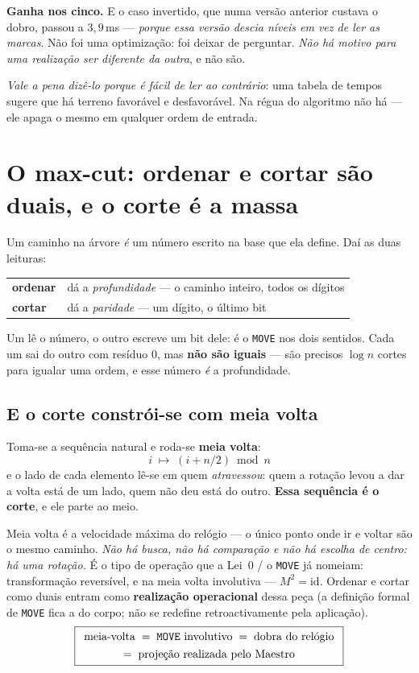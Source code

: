 \documentclass[11pt,a4paper]{article}
\newcommand{\code}[1]{\texttt{\small #1}}
\begin{document}
\smallskip
\noindent \textbf{Ganha nos cinco.} E o caso invertido, que numa versão anterior custava o dobro,
passou a $3{,}9$\,ms --- \emph{porque essa versão descia níveis em vez de ler as marcas}. Não foi
uma optimização: foi deixar de perguntar. \emph{Não há motivo para uma realização ser diferente da
outra}, e não são.

\smallskip
\noindent \emph{Vale a pena dizê-lo porque é fácil de ler ao contrário}: uma tabela de tempos
sugere que há terreno favorável e desfavorável. Na régua do algoritmo não há --- ele apaga o mesmo
em qualquer ordem de entrada.

\section{O max-cut: ordenar e cortar são duais, e o corte é a massa}\label{sec:cortar}

Um caminho na árvore \emph{é} um número escrito na base que ela define. Daí as duas leituras:

\begin{center}\small
\begin{tabular}{@{}ll@{}}
\toprule
\textbf{ordenar} & dá a \emph{profundidade} --- o caminho inteiro, todos os dígitos \\
\textbf{cortar} & dá a \emph{paridade} --- um dígito, o último bit \\
\bottomrule
\end{tabular}
\end{center}

\noindent Um lê o número, o outro escreve um bit dele: é o \code{MOVE} nos dois sentidos. Cada um sai
do outro com resíduo $0$, mas \textbf{não são iguais} --- são precisos $\log n$ cortes para igualar
uma ordem, e esse número \emph{é} a profundidade.

\subsection*{E o corte constrói-se com meia volta}

Toma-se a sequência natural e roda-se \textbf{meia volta}:
\[
  \boxed{\;i \;\longmapsto\; (i + n/2) \bmod n\;}
\]
e o lado de cada elemento lê-se em quem \emph{atravessou}: quem a rotação levou a dar a volta está de
um lado, quem não deu está do outro. \textbf{Essa sequência é o corte}, e ele parte ao meio.

\smallskip
\noindent Meia volta é a velocidade máxima do relógio --- o único ponto onde ir e voltar são o mesmo
caminho. \emph{Não há busca, não há comparação e não há escolha de centro: há uma rotação.} É o
tipo de operação que a Lei~$0$ / o \code{MOVE} já nomeiam: transformação reversível, e na meia volta
involutiva --- $M^{2}=\mathrm{id}$. Ordenar e cortar como duais entram como \textbf{realização
operacional} dessa peça (a definição formal de \code{MOVE} fica a do corpo; não se redefine
retroactivamente pela aplicação).
\[
\boxed{
\begin{array}{c}
\text{meia-volta}
\;=\;
\text{\texttt{MOVE} involutivo}
\;=\;
\text{dobra do relógio}
\\[0.35em]
=\;
\text{projeção realizada pelo Maestro}
\end{array}
}
\]
\end{document}
